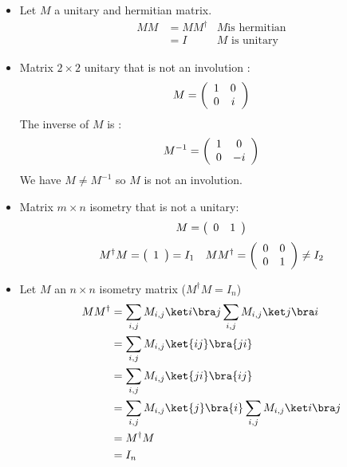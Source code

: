 \begin{itemize}
  \item Let $M$ a unitary and hermitian matrix.
    \begin{align*}
      M M &= M M^\dagger & M \text{is hermitian} \\
          &= I & M \text{ is unitary}
    \end{align*}
  \item Matrix $2\times 2$ unitary that is not an involution :
    \begin{align*}
      M = \left(
      \begin{array}{c c}
        1 & 0\\
        0 & i\\
      \end{array}
      \right)
    \end{align*}
    The inverse of $M$ is :
    \begin{align*}
      M^{-1} = \left(
      \begin{array}{c c}
        1 & 0\\
        0 & -i\\
      \end{array}
      \right)
    \end{align*}
    We have $M \not = M^{-1}$ so $M$ is not an involution.
  \item Matrix $m\times n$ isometry that is not a unitary:
    \begin{align*}
      M = \left(
      \begin{array}{c c}
        0 & 1\\
      \end{array}
      \right)
    \end{align*}
    \begin{align*}
      M^\dagger M =
      \left(\begin{array}{c}
        1\\
      \end{array}
      \right) = I_1
      \quad
      MM^\dagger =
      \left(\begin{array}{c c}
        0 & 0\\
        0 & 1
      \end{array}
      \right) \not = I_2
    \end{align*}
  \item Let $M$ an $n \times n$ isometry matrix ($M^\dagger M = I_n$)
    \begin{align*}
      MM^\dagger &=
      \sum_{i,j} M_{i,j} \ket i \bra j \sum_{i,j} M_{i,j} \ket j \bra i \\
      &= \sum_{i,j} M_{i,j} \ket{ij} \bra{ji} \\
      &= \sum_{i,j} M_{i,j} \ket{ji} \bra{ij} \\
      &= \sum_{i,j} M_{i,j} \ket{j} \bra{i} \sum_{i,j} M_{i,j} \ket i \bra j \\
      &= M^\dagger M \\
      &= I_n
    \end{align*}

\end{itemize}
